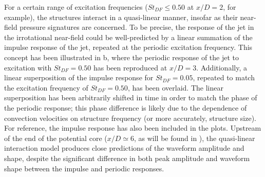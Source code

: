 For a certain range of excitation frequencies ($St_{DF} \leq 0.50$ at $x/D = 2$, for example), the structures interact in a quasi-linear manner, insofar as their near-field pressure signatures are concerned. 
To be precise, the response of the jet in the irrotational near-field could be well-predicted by a linear summation of the impulse response of the jet, repeated at the periodic excitation frequency. 
This concept has been illustrated in b, where the periodic response of the jet to excitation with $St_{DF} = 0.50$ has been reproduced at $x/D = 3$. 
Additionally, a linear superposition of the impulse response for $St_{DF} = 0.05$, repeated to match the excitation frequency of $St_{DF} = 0.50$, has been overlaid. 
The linear superposition has been arbitrarily shifted in time in order to match the phase of the periodic response; this phase difference is likely due to the dependence of convection velocities on structure frequency \citep{Veltin2011} (or more accurately, structure size). 
For reference, the impulse response has also been included in the plots. 
Upstream of the end of the potential core ($x/D \simeq 6$, as will be found in ), the quasi-linear interaction model produces close predictions of the waveform amplitude and shape, despite the significant difference in both peak amplitude and waveform shape between the impulse and periodic responses. 

